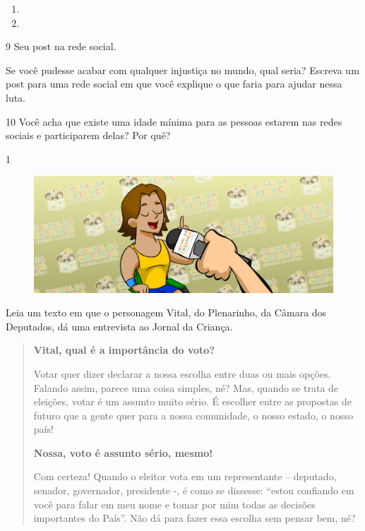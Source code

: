 \begin{enumerate}
\item {}

\item {}
\end{enumerate}

\pagebreak
\num{9} Seu post na rede social.

Se você pudesse acabar com qualquer injustiça no mundo, qual seria?
Escreva um post para uma rede social em que você explique o que faria para ajudar nessa luta.

\begin{mdframed}[linewidth=2pt,linecolor=salmao]
\vspace{10cm}
\end{mdframed}

\num{10} Você acha que existe uma idade mínima para as pessoas estarem nas redes sociais e participarem delas? Por quê?



\num{1}

\begin{figure}[htpb!]
\includegraphics[width=.5\textwidth]{./imgs/img51.png}
\end{figure}

Leia um texto em que o personagem Vital, do Plenarinho, da Câmara dos Deputados, dá uma entrevista ao Jornal da Criança.

\begin{quote}
\textbf{Vital, qual é a importância do voto?}

Votar quer dizer declarar a nossa escolha entre duas ou mais opções.
Falando assim, parece uma coisa simples, né? Mas, quando se trata de
eleições, votar é um assunto muito sério. É escolher entre as propostas
de futuro que a gente quer para a nossa comunidade, o nosso estado, o
nosso país!

\noindent\textbf{Nossa, voto é assunto sério, mesmo!}

Com certeza! Quando o eleitor vota em um representante -- deputado,
senador, governador, presidente -, é como se dissesse: “estou confiando
em você para falar em meu nome e tomar por mim todas as decisões
importantes do País”. Não dá para fazer essa escolha sem pensar bem,
né?

\end{quote}

